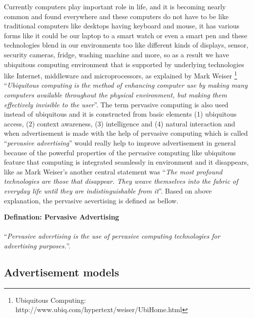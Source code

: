 Currently computers play important role in life, and it is becoming nearly common and found everywhere and these computers do not have to be like traditional computers like desktops having keyboard and mouse, it has various forms like it could be our laptop to a smart watch or even a smart pen and these technologies blend in our environments too like different kinds of displays, sensor, security cameras, fridge, washing machine and more, so as a result we have ubiquitous computing environment that is supported by underlying technologies like Internet, middleware and microprocessors, as explained by Mark Weiser \footnote{Ubiquitous Computing: http://www.ubiq.com/hypertext/weiser/UbiHome.html}  \cite{ubiquitous_computing} ``\emph{Ubiquitous computing is the method of enhancing computer use by making many computers available throughout the physical environment, but making them effectively invisible to the user}''. The term pervasive computing is also used instead of ubiquitous  \cite{pervasiv_ubiquitous} and it is constructed from basic elements \cite{pervais_ad} (1) ubiquitous access, (2) context awareness, (3) intelligence and (4) natural interaction and when advertisement is made with the help of pervasive computing which is called ``\emph{pervasive advertising}'' would really help to improve advertisement in general because of the powerful properties of the pervasive computing like ubiquitous feature that computing is integrated seamlessly in environment and it disappears, like as Mark Weiser’s \cite{twenty_first} another central statement was ``\emph{The most profound technologies are those that disappear. They weave themselves into the fabric of everyday life until they are indistinguishable from it}''. Based on above explanation, the pervasive aevertising is defined as bellow.

\begin{snugshade}
\textbf{Defination: Pervasive Advertising }\\ \\ ``\emph{Pervasive advertising is the use of pervasive computing technologies for advertising purposes.}''\cite{pervasiv_ad}.
\end{snugshade}


\subsection{Advertisement models}





